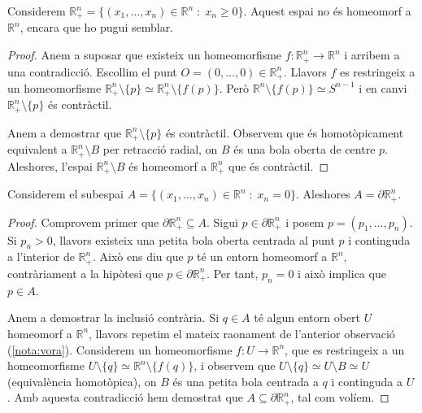\documentclass[../main.tex]{subfiles}
\begin{document}
\begin{nota}
\label{nota:vora}\label{exercici3.1} Considerem $\mathbb{R}^n_+ = \{(x_1,\ldots,x_n)\in\mathbb{R}^n\;:\; x_n\geq 0\}$. Aquest espai no és homeomorf a $\mathbb{R}^n$, encara que ho pugui semblar.
\end{nota}
\begin{proof}
Anem a suposar que existeix un homeomorfisme $f:\mathbb{R}^n_+\rightarrow \mathbb{R}^n$ i arribem a una contradicció. Escollim el punt $O=(0,\ldots,0)\in\mathbb{R}^n_+$. Llavors $f$ es restringeix a un homeomorfisme $\mathbb{R}^n_+\setminus\{p\}\simeq \mathbb{R}^n_+\setminus\{f(p)\}$. Però $\mathbb{R}^n\setminus\{f(p)\}\simeq S^{n-1}$ i en canvi $\mathbb{R}^n_+\setminus\{p\}$ és contràctil.

Anem a demostrar que $\mathbb{R}^n_+\setminus\{p\}$ és contràctil. Observem que és homotòpicament equivalent a $\mathbb{R}^n_+\setminus B$ per retracció radial, on $B$ és una bola oberta de centre $p$. Aleshores, l'espai $\mathbb{R}^n_+\setminus B$ és homeomorf a $\mathbb{R}_+^n$ que és contràctil.
\end{proof}

\begin{prop}
\label{prop:voradernplus} Considerem el subespai $A = \{(x_1,\ldots,x_n)\in\mathbb{R}^n\;:\;x_n=0\}$. Aleshores $A = \partial\mathbb{R}^n_+$.
\end{prop}
\begin{proof}
Comprovem primer que $\partial\mathbb{R}^n_+\subseteq A$. Sigui $p\in\partial\mathbb{R}^n_+$ i posem $p = (p_1,\ldots,p_n)$. Si $p_n>0$, llavors existeix una petita bola oberta centrada al punt $p$ i continguda a l'interior de $\mathbb{R}^n_+$. Això ens diu que $p$ té un entorn homeomorf a $\mathbb{R}^n$, contràriament a la hipòtesi que $p\in\partial\mathbb{R}^n_+$. Per tant, $p_n=0$ i això implica que $p\in A$.

Anem a demostrar la inclusió contrària. Si $q\in A$ té algun entorn obert $U$ homeomorf a $\mathbb{R}^n$, llavors repetim el mateix raonament de l'anterior observació (\ref{nota:vora}). Considerem un homeomorfisme $f:U\rightarrow \mathbb{R}^n$, que es restringeix a un homeomorfisme $U\setminus\{q\}\simeq \mathbb{R}^n\setminus\{f(q)\}$, i observem que $U\setminus\{q\}\simeq U\setminus B\simeq U$ (equivalència homotòpica), on $B$ és una petita bola centrada a $q$ i continguda a $U$. Amb aquesta contradicció hem demostrat que $A\subseteq \partial\mathbb{R}^n_+$, tal com volíem.
\end{proof}
\end{document}
